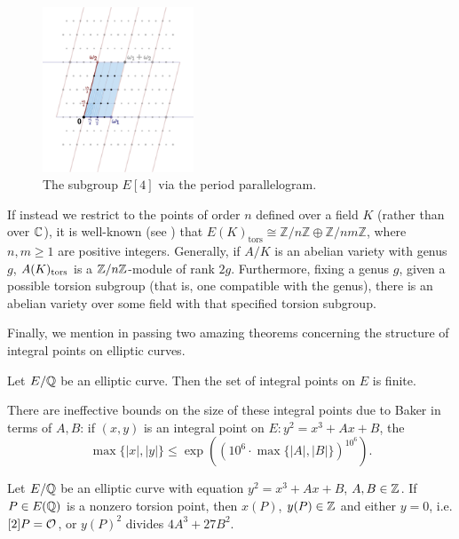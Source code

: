 	\begin{figure}[h]
	\centering
	\includegraphics[width=0.40\textwidth]{images/lattice.eps}
	\caption{The subgroup $E[4]$ via the period parallelogram.\label{fig:e4}}
	\end{figure}
If instead we restrict to the points of order $n$ defined over a field $K$ (rather than over $\mathbb{C}$), it is well-known (see \cite{silvermanarithmetic}) that $E(K)_\text{tors} \cong \mathbb{Z}/n\mathbb{Z} \oplus \mathbb{Z}/nm\mathbb{Z}$, where $n,m \geq 1$ are positive integers. Generally, if $A/K$ is an abelian variety with genus $g$, $A(K)_{\text{tors}}$ is a $\mathbb{Z}/n\mathbb{Z}$-module of rank $2g$. Furthermore, fixing a genus $g$, given a possible torsion subgroup (that is, one compatible with the genus), there is an abelian variety over some field with that specified torsion subgroup. 


Finally, we mention in passing two amazing theorems concerning the structure of integral points on elliptic curves.


\begin{thm} \label{thm:siegel}
Let $E/\mathbb{Q}$ be an elliptic curve. Then the set of integral points on $E$ is finite. 
\end{thm}


There are ineffective bounds on the size of these integral points due to Baker \cite{baker90} in terms of $A, B$: if $(x,y)$ is an integral point on $E: y^2= x^3 + Ax + B$, the
	\[
	\max\{|x|, |y| \} \leq \exp\left(\left(10^6 \cdot \max\{ |A|, |B|\} \right)^{10^6} \right).
	\]


\begin{thm}
Let $E/\mathbb{Q}$ be an elliptic curve with equation $y^2= x^3 + Ax + B$, $A, B \in \mathbb{Z}$. If $P \in E(\mathbb{Q})$ is a nonzero torsion point, then $x(P)$, $y(P) \in \mathbb{Z}$ and either $y= 0$, i.e. $[2]P= \mathcal{O}$, or $y(P)^2$ divides $4A^3 + 27B^2$. 
\end{thm}





